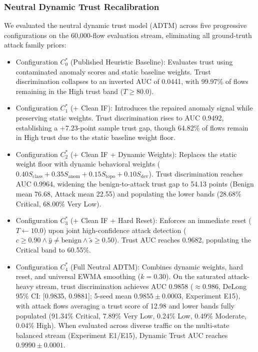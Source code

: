 \documentclass[journal,10pt,onecolumn]{IEEEtran}
\begin{document}
\subsubsection{Neutral Dynamic Trust Recalibration}
We evaluated the neutral dynamic trust model (ADTM) across five progressive configurations on the 60,000-flow evaluation stream, eliminating all ground-truth attack family priors:
\begin{itemize}
  \item Configuration $C_0^*$ (Published Heuristic Baseline): Evaluates trust using contaminated anomaly scores and static baseline weights. Trust discrimination collapses to an inverted AUC of 0.0441, with 99.97\% of flows remaining in the High trust band ($T \ge 80.0$).
  \item Configuration $C_1^*$ (+ Clean IF): Introduces the repaired anomaly signal while preserving static weights. Trust discrimination rises to AUC 0.9492, establishing a $+7.23$-point sample trust gap, though 64.82\% of flows remain in High trust due to the static baseline weight floor.
  \item Configuration $C_2^*$ (+ Clean IF + Dynamic Weights): Replaces the static weight floor with dynamic behavioral weights ($0.40 S_{\text{class}} + 0.35 S_{\text{anom}} + 0.15 S_{\text{topo}} + 0.10 S_{\text{dev}}$). Trust discrimination reaches AUC 0.9964, widening the benign-to-attack trust gap to 54.13 points (Benign mean 76.68, Attack mean 22.55) and populating the lower bands (28.68\% Critical, 68.00\% Very Low).
  \item Configuration $C_3^*$ (+ Clean IF + Hard Reset): Enforces an immediate reset ($T \leftarrow 10.0$) upon joint high-confidence attack detection ($c \ge 0.90 \land \hat{y} \ne \text{benign} \land \tilde{s} \ge 0.50$). Trust AUC reaches 0.9682, populating the Critical band to 60.55\%.
  \item Configuration $C_4^*$ (Full Neutral ADTM): Combines dynamic weights, hard reset, and universal EWMA smoothing ($k = 0.30$). On the saturated attack-heavy stream, trust discrimination achieves AUC 0.9858 ($\approx 0.986$, DeLong 95\% CI: [0.9835, 0.9881]; 5-seed mean $0.9855 \pm 0.0003$, Experiment E15), with attack flows averaging a trust score of 12.98 and lower bands fully populated (91.34\% Critical, 7.89\% Very Low, 0.24\% Low, 0.49\% Moderate, 0.04\% High). When evaluated across diverse traffic on the multi-state balanced stream (Experiment E1/E15), Dynamic Trust AUC reaches $0.9990 \pm 0.0001$.
\end{itemize}
\end{document}
